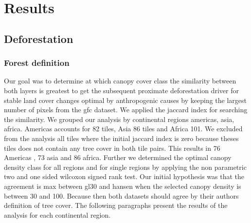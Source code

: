 \chapter{Results}
\label{ch:results}

	\section{Deforestation}
	\label{sec:results_deforestation}

		\subsection{Forest definition}
		\label{subsec:results_forest_definition}
			 Our goal was to determine at which canopy cover class the similarity between both layers is greatest to get the subsequent proximate deforestation driver for stable land cover changes optimal by anthropogenic causes by keeping the largest number of pixels from the gfc dataset. We applied the jaccard index for searching the similarity. We grouped our analysis by continental regions americas, asia, africa. Americas accounts for 82 tiles, Asia 86 tiles and Africa 101. We excluded from the analysis all tiles where the initial jaccard index is zero because theses tiles does not contain any tree cover in both tile pairs. This results in 76 Americas , 73 asia and 86 africa. Further we determined the optimal canopy density class for all regions and for single regions by applying the non parametric two and one sided wilcoxon signed rank test. Our initial hypothesis was that the agreement is max between gl30 and hansen when the selected canopy density is between 30 and 100. Because then both datasets should agree by their authors definition of tree cover. The following paragraphs present the results of the analysis for each continental region. 

